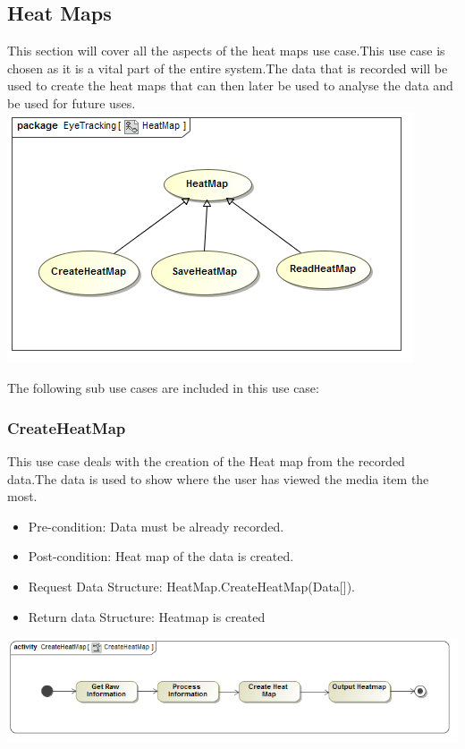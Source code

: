 \subsection{Heat Maps}
	This section will cover all the aspects of the heat maps use case.This use case is chosen as it is a vital part of the entire system.The data that is recorded will be used to create the heat maps that can then later be used to analyse the data and be used for future uses.
	\newline
	\includegraphics[scale=0.5]{Diagrams/Use_Case_Diagram__HeatMap.png}

	The following sub use cases are included in this use case:
	\subsubsection{CreateHeatMap}
This use case deals with the creation of the Heat map from the recorded data.The data is used to show where the user has viewed the media item the most.
	\begin{itemize}
		\item Pre-condition: Data must be already recorded.
		\item Post-condition: Heat map of the data is created.
		\item Request Data Structure: HeatMap.CreateHeatMap(Data[]).
		\item Return data Structure: Heatmap is created
	\end{itemize}
	\includegraphics[scale=0.5]{Diagrams/Activity_Diagram__CreateHeatMap__CreateHeatMap.png}
	
